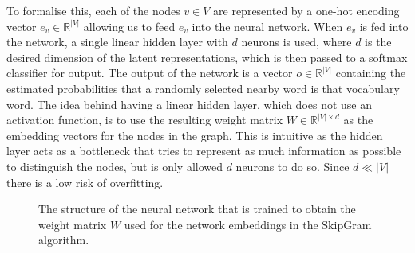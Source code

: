 \documentclass[a4paper]{article}
\begin{document}
To formalise this, each of the nodes $v \in V$ are represented by a one-hot
encoding vector $e_v \in \mathbb{R}^{|V|}$ allowing us to feed $e_v$ into the
neural network. When $e_v$ is fed into the network, a single linear hidden layer with
$d$ neurons is used, where $d$ is the desired dimension of the latent
representations, which is then passed to a softmax classifier for output. The
output of the network is a vector $o \in \mathbb{R}^{|V|}$ containing the estimated
probabilities that a randomly selected nearby word is that vocabulary word.
The idea behind having a linear hidden layer, which does not use an activation
function, is to use the resulting weight matrix $W \in \mathbb{R}^{|V| \times
  d}$ as the embedding vectors for the nodes in the graph. This is intuitive as
the hidden layer acts as a bottleneck that tries to represent as much
information as possible to distinguish the nodes, but is only allowed $d$
neurons to do so. Since $d \ll |V|$ there is a low risk of overfitting.
\begin{figure}[h!]
  \centering
{}

\caption{The structure of the neural network that is trained to obtain
  the weight matrix $W$ used for the network embeddings in the SkipGram algorithm.}
\end{figure}\\
\end{document}
